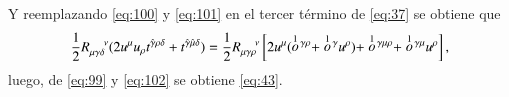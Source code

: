 Y reemplazando \eqref{eq:100} y \eqref{eq:101} en el tercer t\'ermino de \eqref{eq:37} se obtiene que
\begin{equation}
\label{eq:102}
 \frac{1}{2} R^{\ \ \ \ \nu}_{\mu \gamma \delta} (2 u^{\mu} u_{\rho} t^{\hat{\gamma} \rho \delta} + t^{\hat{\gamma} \hat{\mu} \delta}) = \frac{1}{2} R^{\ \ \ \ \nu}_{\mu \gamma \rho} \left[ 2u^{\mu}(\stackrel{1}{o}{\!}^{\gamma \rho} + \stackrel{1}{o}{\!}^{\gamma} u^{\rho}) + \stackrel{1}{o}{\!}^{\gamma \mu \rho} + \stackrel{1}{o}{\!}^{\gamma \mu}  u^{\rho}  \right],
\end{equation}
luego, de \eqref{eq:99} y \eqref{eq:102} se obtiene \eqref{eq:43}.
